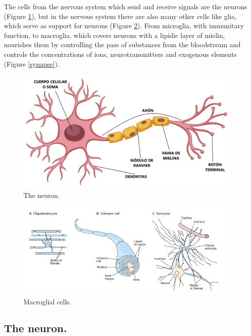 The cells from the nervous system which send and receive signals are the neurons (Figure \ref{neuron}), but in the nervous system there are also many other cells like glia, which serve as support for neurons (Figure \ref{glia}). From microglia, with immunitary function, to macroglia, which covers neurons with a lipidic layer of mielin, nourishes them by controlling the pass of substances from the bloodstream and controls the concentrations of ions, neurotransmitters and exogenous elements (Figure \ref{synapse}).

\begin{figure}[H]
	\centering
	\includegraphics[width=\linewidth]{media/5-neuron.jpg}
	\caption{The neuron.}
	\label{neuron}
\end{figure}

\begin{figure}[H]
	\centering

	\includegraphics[width=\linewidth]{media/5-glia.png}
	\caption{Macroglial cells.}
	\label{glia}
\end{figure}

\subsection{The neuron.}

